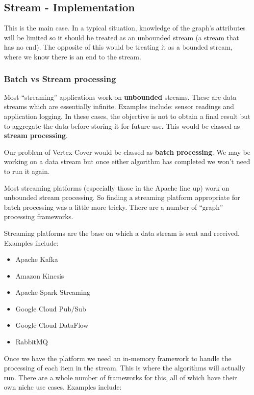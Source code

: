 \subsection{Stream - Implementation}

This is the main case. In a typical situation, knowledge of the graph's
attributes will be limited so it should be treated as an unbounded
stream (a stream that has no end). The opposite of this would be
treating it as a bounded stream, where we know there is an end to the
stream.

\subsubsection{Batch vs Stream processing}

Most ``streaming'' applications work on \textbf{unbounded} streams.
These are data streams which are essentially infinite. Examples include:
sensor readings and application logging. In these cases, the objective
is not to obtain a final result but to aggregate the data before storing
it for future use. This would be classed as \textbf{stream processing}.

Our problem of Vertex Cover would be classed as \textbf{batch
    processing}. We may be working on a data stream but once either
algorithm has completed we won't need to run it again.

Most streaming platforms (especially those in the Apache line up) work
on unbounded stream processing. So finding a streaming platform
appropriate for batch processing was a little more tricky. There are a
number of ``graph'' processing frameworks.

Streaming platforms are the base on which a data stream is sent and
received. Examples include:

\begin{itemize}
    \item
          Apache Kafka
    \item
          Amazon Kinesis
    \item
          Apache Spark Streaming
    \item
          Google Cloud Pub/Sub
    \item
          Google Cloud DataFlow
    \item
          RabbitMQ
\end{itemize}

Once we have the platform we need an in-memory framework to handle the
processing of each item in the stream. This is where the algorithms will
actually run. There are a whole number of frameworks for this, all of
which have their own niche use cases. Examples include:

